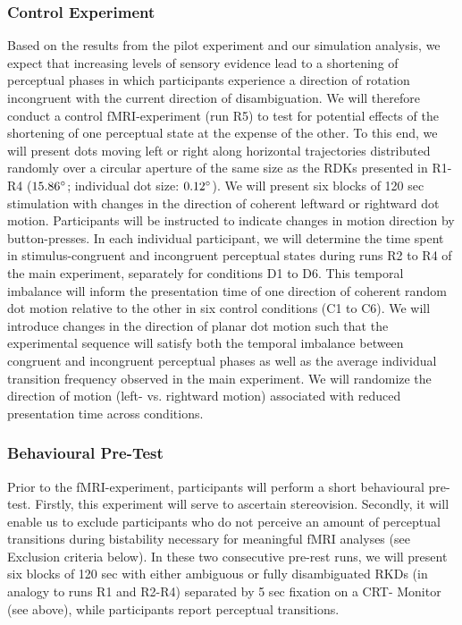 \documentclass[12pt]{article}
\begin{document}
\subsubsection{Control Experiment}
Based on the results from the pilot experiment and our simulation analysis, we expect that increasing levels of sensory evidence lead to a shortening of perceptual phases in which participants experience a direction of rotation incongruent with the current direction of disambiguation. We will therefore conduct a control fMRI-experiment (run R5) to test for potential effects of the shortening of one perceptual state at the expense of the other. To this end, we will present dots moving left or right along horizontal trajectories distributed randomly over a circular aperture of the same size as the RDKs presented in R1-R4 ($15.86\degree$; individual dot size: $0.12\degree$). We will present six blocks of 120 sec stimulation with changes in the direction of coherent leftward or rightward dot motion. Participants will be instructed to indicate changes in motion direction by button-presses. In each individual participant, we will determine the time spent in stimulus-congruent and incongruent perceptual states during runs R2 to R4 of the main experiment, separately for conditions D1 to D6. This temporal imbalance will inform the presentation time of one direction of coherent random dot motion relative to the other in six control conditions (C1 to C6). We will introduce changes in the direction of planar dot motion such that the experimental sequence will satisfy both the temporal imbalance between congruent and incongruent perceptual phases as well as the average individual transition frequency observed in the main experiment. We will randomize the direction of motion (left- vs. rightward motion) associated with reduced presentation time across conditions.  

\subsubsection{Behavioural Pre-Test}
Prior to the fMRI-experiment, participants will perform a short behavioural pre-test. Firstly, this experiment will serve to ascertain stereovision. Secondly, it will enable us to exclude participants who do not perceive an amount of perceptual transitions during bistability necessary for meaningful fMRI analyses (see Exclusion criteria below).  In these two consecutive pre-rest runs, we will present six blocks of 120 sec with either ambiguous or fully disambiguated RKDs (in analogy to runs R1 and R2-R4) separated by 5 sec fixation on a CRT- Monitor (see above), while participants report perceptual transitions.  
\end{document}
